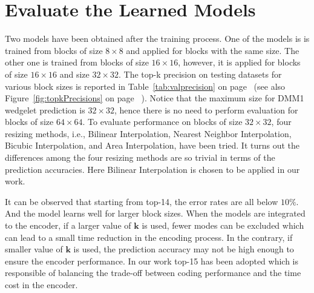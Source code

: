 \section{Evaluate the Learned Models}\label{sec:eval-section}
Two models have been obtained after the training process.
One of the models is is trained from blocks of size \(8\times8\) and 
applied for blocks with the same size.
The other one is trained from blocks of size \(16\times16\), however, 
it is applied for blocks of size \(16\times16\) and size \(32\times32\).
The top-k precision on testing datasets for various 
block sizes is reported in
Table~\ref{tab:valprecision} 
on page~\pageref{tab:valprecision}
(see also Figure~\ref{fig:topkPrecisions}
on page~\pageref{fig:topkPrecisions}
).
Notice that the maximum size for DMM1 wedgelet prediction 
is \(32\times32\), hence there is no need to perform evaluation 
for blocks of size \(64\times64\).
To evaluate performance on blocks of size \(32\times32\),
four resizing methods, i.e., Bilinear Interpolation, 
Nearest Neighbor Interpolation, 
Bicubic Interpolation, and
Area Interpolation,
have been tried.
It turns out the differences among 
the four resizing methods are so trivial
in terms of the prediction accuracies.
Here Bilinear Interpolation
is chosen to be applied in our work.

It can be observed that starting from top-14,
the error rates are all below \(10\% \).
And the model learns well for larger block sizes.
When the models are integrated to the encoder,
if a larger value of \(\mathbf{k}\) is used, 
fewer modes can be excluded which can 
lead to a small time reduction in the encoding process.
In the contrary, if smaller value of \(\mathbf{k}\) is used,
the prediction accuracy may not be high enough
to ensure the encoder performance.
In our work top-15 has been adopted which 
is responsible of balancing
the trade-off between coding performance and 
the time cost in the encoder.



